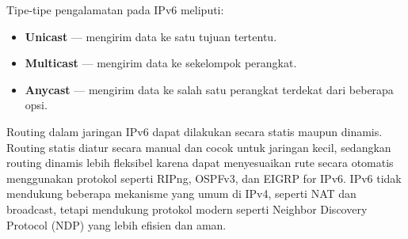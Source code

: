 Tipe-tipe pengalamatan pada IPv6 meliputi:
\begin{itemize}
  \item \textbf{Unicast} --- mengirim data ke satu tujuan tertentu.
  \item \textbf{Multicast} --- mengirim data ke sekelompok perangkat.
  \item \textbf{Anycast} --- mengirim data ke salah satu perangkat terdekat dari beberapa opsi.
\end{itemize}

Routing dalam jaringan IPv6 dapat dilakukan secara statis maupun dinamis. Routing statis diatur secara manual dan cocok untuk jaringan kecil, sedangkan routing dinamis lebih fleksibel karena dapat menyesuaikan rute secara otomatis menggunakan protokol seperti RIPng, OSPFv3, dan EIGRP for IPv6. IPv6 tidak mendukung beberapa mekanisme yang umum di IPv4, seperti NAT dan broadcast, tetapi mendukung protokol modern seperti Neighbor Discovery Protocol (NDP) yang lebih efisien dan aman.

